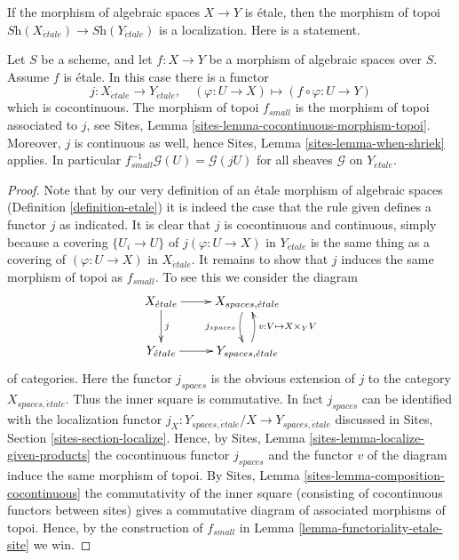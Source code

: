 \noindent
If the morphism of algebraic spaces $X \to Y$ is \'etale, then the morphism
of topoi $\textit{Sh}(X_{\acute{e}tale}) \to \textit{Sh}(Y_{\acute{e}tale})$
is a localization. Here is a statement.

\begin{lemma}
\label{lemma-etale-morphism-topoi}
Let $S$ be a scheme, and let $f : X \to Y$ be a morphism of algebraic spaces
over $S$. Assume $f$ is \'etale. In this case there is a functor
$$
j : X_{\acute{e}tale} \to Y_{\acute{e}tale},\quad
(\varphi : U \to X) \mapsto (f \circ \varphi : U \to Y)
$$
which is cocontinuous. The morphism of topoi $f_{small}$ is the
morphism of topoi associated to $j$, see
Sites, Lemma \ref{sites-lemma-cocontinuous-morphism-topoi}.
Moreover, $j$ is continuous as well, hence
Sites, Lemma \ref{sites-lemma-when-shriek}
applies. In particular $f_{small}^{-1}\mathcal{G}(U) = \mathcal{G}(jU)$
for all sheaves $\mathcal{G}$ on $Y_{\acute{e}tale}$.
\end{lemma}

\begin{proof}
Note that by our very definition of an \'etale morphism of algebraic spaces
(Definition \ref{definition-etale}) it is
indeed the case that the rule given defines a functor $j$ as indicated.
It is clear that $j$ is cocontinuous and continuous, simply because a covering
$\{U_i \to U\}$ of $j(\varphi : U \to X)$ in $Y_{\acute{e}tale}$ is the
same thing as a covering of $(\varphi : U \to X)$ in $X_{\acute{e}tale}$. It
remains to show that $j$ induces the same morphism of topoi as $f_{small}$.
To see this we consider the diagram
$$
\xymatrix{
X_{\acute{e}tale} \ar[r] \ar[d]^j &
X_{spaces, \acute{e}tale} \ar@/_/[d]_{j_{spaces}} \\
Y_{\acute{e}tale} \ar[r] &
Y_{spaces, \acute{e}tale} \ar@/_/[u]_{v : V \mapsto X \times_Y V}
}
$$
of categories. Here the functor $j_{spaces}$ is the obvious extension of $j$
to the category $X_{spaces, \acute{e}tale}$. Thus the inner square is
commutative. In fact $j_{spaces}$ can be identified with the
localization functor
$j_X : Y_{spaces, \acute{e}tale}/X \to Y_{spaces, \acute{e}tale}$
discussed in
Sites, Section \ref{sites-section-localize}.
Hence, by
Sites, Lemma \ref{sites-lemma-localize-given-products}
the cocontinuous functor $j_{spaces}$ and the functor $v$ of the diagram
induce the same morphism of topoi. By
Sites, Lemma \ref{sites-lemma-composition-cocontinuous}
the commutativity of the inner square (consisting of cocontinuous functors
between sites) gives a commutative diagram of associated morphisms of topoi.
Hence, by the construction of $f_{small}$ in
Lemma \ref{lemma-functoriality-etale-site} we win.
\end{proof}

